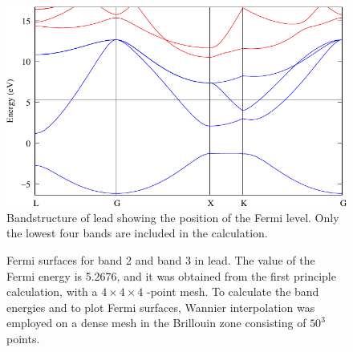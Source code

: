 \begin{enumerate}
\begin{figure}[h!]
\centering
\includegraphics[scale=0.8]{figure/example02/lead.pdf}
\caption{Bandstructure of lead showing the position of the Fermi level. Only the lowest four bands
are included in the calculation.}\label{fig2.1}
\end{figure}

\begin{figure}[h!]
\centering
{}
\centering
{}
\centering
{}
\caption{Fermi surfaces for band 2 and band 3 in lead. The value of the Fermi energy is 5.2676\eV, and it was obtained from the first principle calculation, with a $4\times4\times4$ \bfk-point mesh. To calculate the band energies and to plot Fermi surfaces, Wannier interpolation was employed on a dense mesh in the Brillouin zone consisting of $50^3$ points.}\label{fig2.2}
\end{figure}
\end{enumerate}
